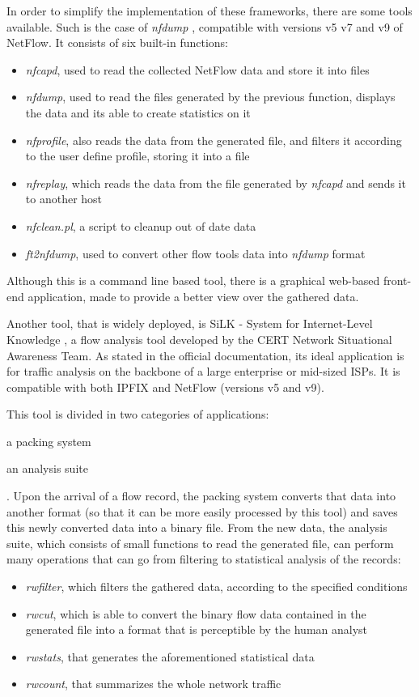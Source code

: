\documentclass[runningheads,a4paper]{llncs}
\begin{document}
In order to simplify the implementation of these frameworks, there are some tools available. Such is the case of \textit{nfdump} \cite{nfdump}, compatible with versions v5 v7 and v9 of NetFlow. It consists of six built-in functions:
\begin{itemize}
\item \textit{nfcapd}, used to read the collected NetFlow data and store it into files
\item \textit{nfdump}, used to read the files generated by the previous function, displays the data and its able to create statistics on it
\item \textit{nfprofile}, also reads the data from the generated file, and filters it according to the user define profile, storing it into a file
\item \textit{nfreplay}, which reads the data from the file generated by \textit{nfcapd} and sends it to another host
\item \textit{nfclean.pl}, a script to cleanup out of date data
\item \textit{ft2nfdump}, used to convert other flow tools data into \textit{nfdump} format
\end{itemize} 

Although this is a command line based tool, there is a graphical web-based front-end application, made to provide a better view over the gathered data.


Another tool, that is widely deployed, is SiLK - System for Internet-Level Knowledge \cite{silk}, a flow analysis tool developed by the CERT Network Situational Awareness Team. As stated in the official documentation, its ideal application is for traffic analysis on the backbone of a large enterprise or mid-sized ISPs. It is compatible with both IPFIX and NetFlow (versions v5 and v9). 


This tool is divided in two categories of applications: 
\begin{enumerate*}
\item a packing system
\item an analysis suite
\end{enumerate*}. Upon the arrival of a flow record, the packing system converts that data into another format (so that it can be more easily processed by this tool) and saves this newly converted data into a binary file. From the new data, the analysis suite, which consists of small functions to read the generated file, can perform many operations that can go from filtering to statistical analysis of the records:
\begin{itemize}
\item \textit{rwfilter}, which filters the gathered data, according to the specified conditions
\item \textit{rwcut}, which is able to convert the binary flow data contained in the generated file into a format that is perceptible by the human analyst
\item \textit{rwstats}, that generates the aforementioned statistical data
\item \textit{rwcount}, that summarizes the whole network traffic
\end{itemize}
\end{document}
